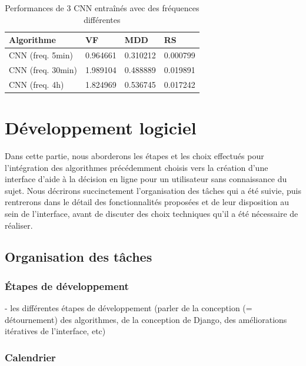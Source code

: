 \documentclass[a4paper, 10pt]{article}
\begin{document}
\begin{center}
\begin{table}[!ht]
\begin{tabularx}{\textwidth}{YYYY}
\toprule
\textbf{Algorithme} & \textbf{VF} & \textbf{MDD} & \textbf{RS}\\
\midrule
CNN (freq. 5min)    & 0.964661 & 0.310212 &  0.000799 \\
CNN (freq. 30min)   & 1.989104 & 0.488889 &  0.019891 \\
CNN (freq. 4h)      & 1.824969 & 0.536745 &  0.017242 \\
\bottomrule
\end{tabularx}
\caption{Performances de 3 CNN entraînés avec des fréquences différentes}
\label{tab:cnn_compar}
\end{table}
\end{center}

\newpage
\section{Développement logiciel}

Dans cette partie, nous aborderons les étapes et les choix effectués pour l'intégration des algorithmes précédemment choisis vers la création d'une interface d'aide à la décision en ligne pour un utilisateur sans connaissance du sujet. Nous décrirons succinctement l'organisation des tâches qui a été suivie, puis rentrerons dans le détail des fonctionnalités proposées et de leur disposition au sein de l'interface, avant de discuter des choix techniques qu'il a été nécessaire de réaliser.

\subsection{Organisation des tâches}

\subsubsection{Étapes de développement}

- les différentes étapes de développement (parler de la conception (= détournement) des algorithmes, de la conception de Django, des améliorations itératives de l'interface, etc)

\subsubsection{Calendrier}
\end{document}
